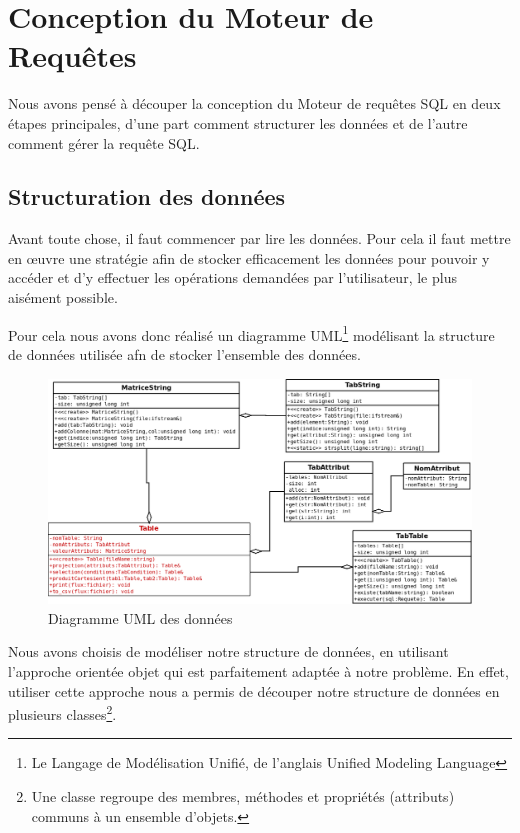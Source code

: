 \documentclass[oneside,13pt,a4paper]{report}
\begin{document}

\chapter{Conception du Moteur de Requêtes}

Nous avons pensé à découper la conception du Moteur de requêtes SQL en deux étapes principales, d'une part comment structurer les données et de l'autre comment gérer la requête SQL.

\section{Structuration des données}

Avant toute chose, il faut commencer par lire les données. Pour cela il faut mettre en \oe uvre une stratégie afin de stocker efficacement les données pour pouvoir y accéder et d’y effectuer les opérations demandées par l'utilisateur, le plus aisément possible.

Pour cela nous avons donc réalisé un diagramme UML\footnote{Le Langage de Modélisation Unifié, de l'anglais Unified Modeling Language} modélisant la structure de données utilisée afn de stocker l'ensemble des données.

\vfill

\begin{figure}[h]
	\includegraphics[width=1\textwidth]{img/sql.png}\par
	\vspace{0.1cm}
	\caption{Diagramme UML des données}
	\label{uml-donnees}
\end{figure}

\pagebreak

Nous avons choisis de modéliser notre structure de données, en utilisant l'approche orientée objet qui est parfaitement adaptée à notre problème. En effet, utiliser cette approche nous a permis de découper notre structure de données en plusieurs classes\footnote{Une classe regroupe des membres, méthodes et propriétés (attributs) communs à un ensemble d'objets.}.
\end{document}
